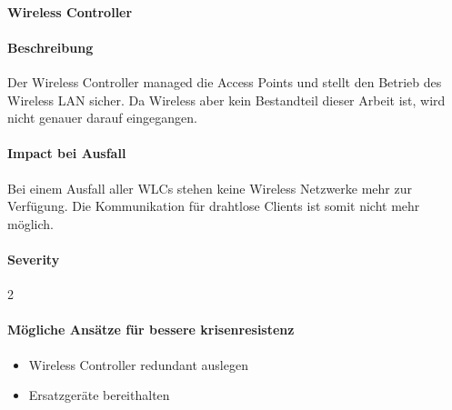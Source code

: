 \paragraph{Wireless Controller}
\paragraph{Beschreibung}
Der Wireless Controller managed die Access Points und stellt den Betrieb des Wireless LAN sicher. Da Wireless aber kein Bestandteil dieser Arbeit ist, wird nicht genauer darauf eingegangen.

\paragraph{Impact bei Ausfall}
Bei einem Ausfall aller WLCs stehen keine Wireless Netzwerke mehr zur Verfügung. Die Kommunikation für drahtlose Clients ist somit nicht mehr möglich.

\paragraph{Severity} 2

\paragraph{Mögliche Ansätze für bessere krisenresistenz}
\begin{itemize}
	\item Wireless Controller redundant auslegen
	\item Ersatzgeräte bereithalten
\end{itemize}
